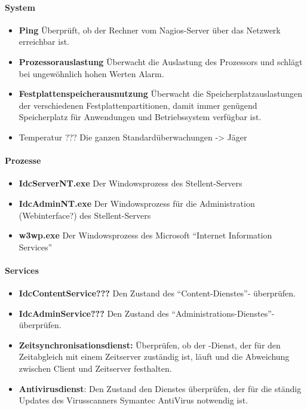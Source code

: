 \paragraph{System}
\begin{itemize}
\item \textbf{Ping} Überprüft, ob der Rechner vom Nagios-Server über das Netzwerk erreichbar ist.
\item \textbf{Prozessorauslastung} Überwacht die Auslastung des Prozessors und schlägt bei ungewöhnlich hohen Werten Alarm.
\item \textbf{Festplattenspeicherausnutzung} Überwacht die Speicherplatzauslastungen der verschiedenen Festplattenpartitionen, damit immer genügend Speicherplatz für Anwendungen und Betriebssystem verfügbar ist.
\item Temperatur ??? Die ganzen Standardüberwachungen -> Jäger
\end{itemize}

\paragraph{Prozesse}
\begin{itemize}
\item \textbf{IdcServerNT.exe} Der Windowsprozess des Stellent-Servers
\item \textbf{IdcAdminNT.exe} Der Windowsprozess für die Administration (Webinterface?) des Stellent-Servers
\item \textbf{w3wp.exe} Der Windowsprozess des Microsoft "`Internet Information Services"'
\end{itemize}

\paragraph{Services}
\begin{itemize}
\item \textbf{IdcContentService???}  Den Zustand des "`Content-Dienstes"'- überprüfen.
\item \textbf{IdcAdminService???}  Den Zustand des "`Administrations-Dienstes"'- überprüfen.
\item \textbf{Zeitsynchronisationsdienst:} Überprüfen, ob der -Dienst, der für den Zeitabgleich mit einem Zeitserver zuständig ist, läuft und die Abweichung zwischen Client und Zeitserver festhalten.
\item \textbf{Antivirusdienst}: Den Zustand den Dienstes überprüfen, der für die ständig Updates des Virusscanners Symantec AntiVirus notwendig ist.
\end{itemize}

